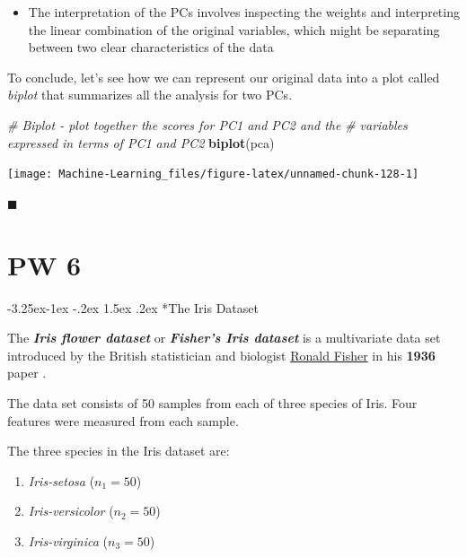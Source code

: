 \documentclass[]{book}
\makeatletter
\newenvironment{Shaded}{\begin{snugshade}}{\end{snugshade}}
\newcommand{\KeywordTok}[1]{\textcolor[rgb]{0.13,0.29,0.53}{\textbf{#1}}}
\newcommand{\CommentTok}[1]{\textcolor[rgb]{0.56,0.35,0.01}{\textit{#1}}}
\newcommand{\NormalTok}[1]{#1}
\providecommand{\tightlist}{%
  \setlength{\itemsep}{0pt}\setlength{\parskip}{0pt}}
\newenvironment{rmdblock}[1]
  {\begin{shaded*}
  \begin{itemize}
  \renewcommand{\labelitemi}{
    \raisebox{-.7\height}[0pt][0pt]{
      {\setkeys{Gin}{width=2em,keepaspectratio}\texttt{[image: img/icons/\#1]}}
    }
  }
  \item
  }
  {
  \end{itemize}
  \end{shaded*}
  }
\newenvironment{rmdtip}
  {\begin{rmdblock}{tip}}
  {\end{rmdblock}}
\renewcommand\subsection{\@startsection{subsection}{2}{\z@}%
                                     {-3.25ex\@plus -1ex \@minus -.2ex}%
                                     {1.5ex \@plus .2ex}%
                                     {\normalfont\large\bfseries\color{Violet}}}
\theoremstyle{definition}
\theoremstyle{definition}
\theoremstyle{definition}
\theoremstyle{remark}
\makeatother
\begin{document}
\begin{rmdtip}
The interpretation of the PCs involves inspecting the weights and
interpreting the linear combination of the original variables, which
might be separating between two clear characteristics of the data
\end{rmdtip}

To conclude, let's see how we can represent our original data into a
plot called \emph{biplot} that summarizes all the analysis for two PCs.

\begin{Shaded}
\begin{Highlighting}[]
\CommentTok{# Biplot - plot together the scores for PC1 and PC2 and the}
\CommentTok{# variables expressed in terms of PC1 and PC2}
\KeywordTok{biplot}\NormalTok{(pca)}
\end{Highlighting}
\end{Shaded}

\begin{center}\texttt{[image: Machine-Learning\_files/figure-latex/unnamed-chunk-128-1]} \end{center}

◼

\chapter*{PW 6}\label{pw-6}

\subsection*{The Iris Dataset}\label{the-iris-dataset}

The \textbf{\emph{Iris flower dataset}} or \textbf{\emph{Fisher's Iris
dataset}} is a multivariate data set introduced by the British
statistician and biologist
\href{https://en.wikipedia.org/wiki/Ronald_Fisher}{Ronald Fisher} in his
\textbf{1936} paper \citep{Fisher1936}.

The data set consists of 50 samples from each of three species of Iris.
Four features were measured from each sample.

The three species in the Iris dataset are:

\begin{enumerate}
\def\labelenumi{\arabic{enumi}.}
\tightlist
\item
  \emph{Iris-setosa} (\(n_1=50\))
\item
  \emph{Iris-versicolor} (\(n_2=50\))
\item
  \emph{Iris-virginica} (\(n_3=50\))
\end{enumerate}
\end{document}
